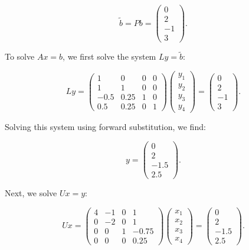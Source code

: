 \documentclass{article}
\begin{document}
\[
    \tilde{b} = Pb = \begin{pmatrix} 0 \\ 2 \\ -1 \\ 3 \end{pmatrix}.
\]

To solve \(Ax = b\), we first solve the system \( Ly = \tilde{b} \):

\[
    Ly = \begin{pmatrix}
        1    & 0    & 0 & 0 \\
        1    & 1    & 0 & 0 \\
        -0.5 & 0.25 & 1 & 0 \\
        0.5  & 0.25 & 0 & 1
    \end{pmatrix}
    \begin{pmatrix}
        y_1 \\ y_2 \\ y_3 \\ y_4
    \end{pmatrix} = \begin{pmatrix} 0 \\ 2 \\ -1 \\ 3 \end{pmatrix}.
\]

Solving this system using forward substitution, we find:

\[
    y = \begin{pmatrix}
        0    \\
        2    \\
        -1.5 \\
        2.5
    \end{pmatrix}.
\]

Next, we solve \( Ux = y \):

\[
    Ux = \begin{pmatrix}
        4 & -1 & 0 & 1     \\
        0 & -2 & 0 & 1     \\
        0 & 0  & 1 & -0.75 \\
        0 & 0  & 0 & 0.25
    \end{pmatrix}
    \begin{pmatrix}
        x_1 \\ x_2 \\ x_3 \\ x_4
    \end{pmatrix} = \begin{pmatrix}
        0    \\
        2    \\
        -1.5 \\
        2.5
    \end{pmatrix}.
\]
\end{document}

